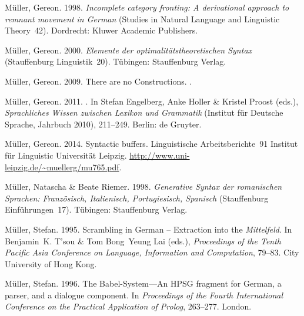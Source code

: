 \begin{thebibliography}{1420}
M{\"u}ller, Gereon. 1998.
\newblock \emph{Incomplete category fronting: {A} derivational approach to
  remnant movement in {German}} (Studies in Natural Language and Linguistic
  Theory~42).
\newblock Dordrecht: Kluwer Academic Publishers.

M{\"u}ller, Gereon. 2000.
\newblock \emph{{Elemente der optimalit{\"a}tstheoretischen Syntax}}
  (Stauffenburg Linguistik~20).
\newblock T{\"u}bingen: Stauffenburg Verlag.

M{\"u}ller, Gereon. 2009{}.
\newblock There are no {Constructions}.
.

M{\"u}ller, Gereon. 2011.
.
\newblock In Stefan Engelberg, Anke Holler \& Kristel Proost (eds.),
  \emph{{Sprachliches Wissen zwischen Lexikon und Grammatik}}  (Institut
  f{\"u}r Deutsche Sprache, Jahrbuch 2010), 211--249. Berlin: de Gruyter.

M{\"u}ller, Gereon. 2014{}.
\newblock Syntactic buffers.
\newblock Linguistische Arbeitsberichte~91 Institut f{\"u}r Linguistic
  Universit{\"a}t Leipzig.
\newblock \urlprefix\url{http://www.uni-leipzig.de/~muellerg/mu765.pdf}.

M{\"u}ller, Natascha \& Beate Riemer. 1998.
\newblock \emph{{Generative Syntax der romanischen Sprachen: Franz{\"o}sisch,
  Italienisch, Portugiesisch, Spanisch}} (Stauffenburg Einf{\"u}hrungen~17).
\newblock T{\"u}bingen: Stauffenburg Verlag.

M{\"u}ller, Stefan. 1995.
\newblock Scrambling in {German} -- {Extraction} into the \emph{Mittelfeld}.
\newblock In Benjamin~K. T'sou \& Tom Bong~Yeung Lai (eds.), \emph{Proceedings
  of the {Tenth Pacific Asia Conference on Language, Information and
  Computation}}, 79--83. City University of Hong Kong.

M{\"u}ller, Stefan. 1996{}.
\newblock The {Babel-System}---{An} {HPSG} fragment for {German}, a parser, and
  a dialogue component.
\newblock In \emph{Proceedings of the {Fourth International Conference on the
  Practical Application of Prolog}}, 263--277. London.


\end{thebibliography}
